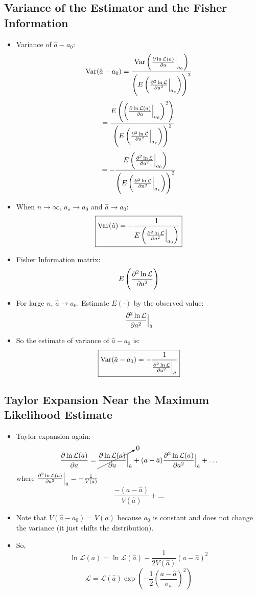 \subsection{Variance of the Estimator and the Fisher Information}

\begin{itemize}
      \item Variance of $\hat{a} - a_0$:
            \[ \text{Var}(\hat{a} - a_0) = \frac{\text{Var}\left( \pdv{\ln \mathcal{L}(a)}{a} \Big|_{a_0} \right)}{\left( E\left( \pdv[2]{\ln \mathcal{L}}{a} \Big|_{a_{\star}} \right) \right)^2} \]
            \[ = \frac{E\left( \left( \pdv{\ln \mathcal{L}(a)}{a} \Big|_{a_0} \right)^2 \right)}{\left( E\left( \pdv[2]{\ln \mathcal{L}}{a} \Big|_{a_{\star}} \right) \right)^2} \]
            \[ = -\frac{E\left( \pdv[2]{\ln \mathcal{L}}{a} \Big|_{a_0} \right)}{\left( E\left( \pdv[2]{\ln \mathcal{L}}{a} \Big|_{a_{\star}} \right) \right)^2} \]
      \item When $n \to \infty$, $a_{\star} \to a_0$ and $\hat{a} \to a_0$:
            \[ \boxed{\text{Var}(\hat{a}) = -\frac{1}{E\left( \pdv[2]{\ln \mathcal{L}}{a} \Big|_{a_0} \right)} } \]
      \item Fisher Information matrix:
            \[ E\left( \pdv[2]{\ln \mathcal{L}}{a} \right) \]
      \item For large $n$, $\hat{a} \to a_0$. Estimate $E(\cdot)$ by the observed value:
            \[ \pdv[2]{\ln \mathcal{L}}{a} \Big|_{\hat{a}} \]
      \item So the estimate of variance of $\hat{a} - a_0$ is:
            \[ \boxed{\text{Var}(\hat{a}-a_0) = -\frac{1}{\pdv[2]{\ln \mathcal{L}}{a} \Big|_{\hat{a}}} } \]
\end{itemize}

\subsection{Taylor Expansion Near the Maximum Likelihood Estimate}

\begin{itemize}
      \item Taylor expansion again:
            \[ \pdv{\ln \mathcal{L}(a)}{a} = \cancelto{0}{\pdv{\ln \mathcal{L}(a)}{a} \Big|_{\hat{a}}} + (a - \hat{a}) \pdv[2]{\ln \mathcal{L}(a)}{a} \Big|_{\hat{a}} + \ldots \]
            where $\pdv[2]{\ln \mathcal{L}(a)}{a} \Big|_{\hat{a}} = -\frac{1}{V(\hat{a})}$
            \[ \frac{-(a-\hat{a})}{V(\hat{a})} + \ldots \]
      \item Note that $V(\hat{a} - a_0) = V(\hat{a})$ because $a_0$ is constant and does not change the variance (it just shifts the distribution).
      \item So,
            \[ \ln \mathcal{L}(a) = \ln \mathcal{L}(\hat{a}) - \frac{1}{2V(\hat{a})} \left( a - \hat{a} \right)^2 \]
            \[ \mathcal{L} = \mathcal{L}(\hat{a}) \exp \left( -\frac{1}{2} (\frac{a - \hat{a}}{\sigma_{\hat{a}}})^2 \right) \]
\end{itemize}

